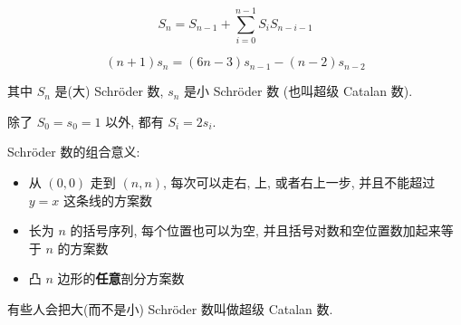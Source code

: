 \[
    S_n = S_{n-1} + \sum_{i = 0} ^ {n - 1} S_i S_{n - i - 1}
\]

\[
    (n + 1)s_n = (6n - 3)s_{n - 1} - (n - 2) s_{n - 2}
\]

其中 \(S_n\) 是(大) Schr\"oder 数, \(s_n\) 是小 Schr\"oder 数 (也叫超级 Catalan 数).

除了 \(S_0 = s_0 = 1\) 以外, 都有 \(S_i = 2s_i\).

Schr\"oder 数的组合意义:

\begin{itemize}
    \item 从 \((0, 0)\) 走到 \((n, n)\), 每次可以走右, 上, 或者右上一步, 并且不能超过 \(y=x\) 这条线的方案数
    \item 长为 \(n\) 的括号序列, 每个位置也可以为空, 并且括号对数和空位置数加起来等于 \(n\) 的方案数
    \item 凸 \(n\) 边形的\textbf{任意}剖分方案数
\end{itemize}

有些人会把大(而不是小) Schr\"oder 数叫做超级 Catalan 数.
